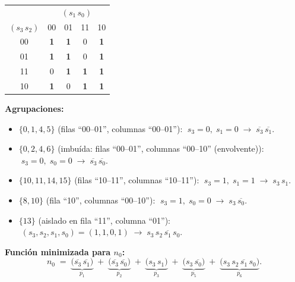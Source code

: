 \documentclass[12pt]{article}
\begin{document}
\begin{center}
\begin{tabular}{c|cccc}
  \multicolumn{1}{c}{} & \multicolumn{4}{c}{\((s_{1}\,s_{0})\)} \\[-2pt]
  \cline{2-5}
  \((s_{3}\,s_{2})\) & 00 & 01 & 11 & 10 \\
  \cline{1-5}
  00 & \bf1 & \bf1 & 0 & \bf1 \\   %
  01 & \bf1 & \bf1 & 0 & \bf1 \\   %
  11 & 0    & \bf1 & \bf1 & \bf1 \\%
  10 & \bf1 & 0    & \bf1 & \bf1 \\%
  \cline{1-5}
\end{tabular}
\end{center}

\noindent
\textbf{Agrupaciones:}
\begin{itemize}
  \item \(\{0,1,4,5\}\) (filas “00–01”, columnas “00–01”):  
    \(\;s_{3}=0,\;s_{1}=0\;\longrightarrow\;\overline{s_{3}}\,\overline{s_{1}}\).
  \item \(\{0,2,4,6\}\) (imbuída: filas “00–01”, columnas “00–10” (envolvente)):  
    \(\;s_{3}=0,\;s_{0}=0\;\longrightarrow\;\overline{s_{3}}\,\overline{s_{0}}\).
  \item \(\{10,11,14,15\}\) (filas “10–11”, columnas “10–11”):  
    \(\;s_{3}=1,\;s_{1}=1\;\longrightarrow\;s_{3}\,s_{1}\).
  \item \(\{8,10\}\) (fila “10”, columnas “00–10”):  
    \(\;s_{3}=1,\;s_{0}=0\;\longrightarrow\;s_{3}\,\overline{s_{0}}\).
  \item \(\{13\}\) (aislado en fila “11”, columna “01”):  
    \(\;(s_{3},s_{2},s_{1},s_{0})=(1,1,0,1)\;\longrightarrow\;s_{3}\,s_{2}\,\overline{s_{1}}\,s_{0}.\)
\end{itemize}

\noindent
\textbf{Función minimizada para \(n_{0}\):}
\[
  n_{0} 
  \;=\; 
    \underbrace{\bigl(\overline{s_{3}}\,\overline{s_{1}}\bigr)}_{p_{1}} 
    \;+\; 
    \underbrace{\bigl(\overline{s_{3}}\,\overline{s_{0}}\bigr)}_{p_{2}} 
    \;+\; 
    \underbrace{\bigl(s_{3}\,s_{1}\bigr)}_{p_{3}} 
    \;+\; 
    \underbrace{\bigl(s_{3}\,\overline{s_{0}}\bigr)}_{p_{5}} 
    \;+\; 
    \underbrace{\bigl(s_{3}\,s_{2}\,\overline{s_{1}}\,s_{0}\bigr)}_{p_{6}}.
\]

\bigskip

\end{document}
